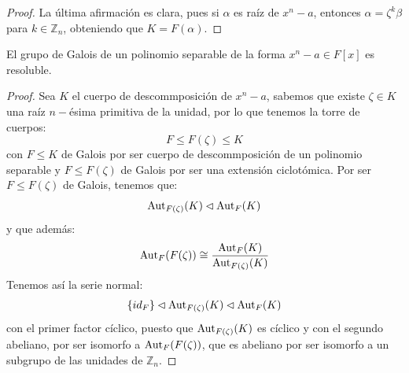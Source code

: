 \begin{teo}
\begin{proof}
        \noindent
        La última afirmación es clara, pues si $\alpha$ es raíz de $x^n-a$, entonces $\alpha = \zeta^k\beta$ para $k \in \mathbb{Z}_n$, obteniendo que $K = F(\alpha)$.
    \end{proof}
\end{teo}

\begin{prop}
    El grupo de Galois de un polinomio separable de la forma $x^n-a\in F[x]$ es resoluble.
    \begin{proof}
        Sea $K$ el cuerpo de descommposición de $x^n-a$, sabemos que existe $\zeta\in K$ una raíz $n-$ésima primitiva de la unidad, por lo que tenemos la torre de cuerpos:
        \begin{equation*}
            F\leq F(\zeta)\leq K
        \end{equation*}
        con $F\leq K$ de Galois por ser cuerpo de descommposición de un polinomio separable y $F\leq F(\zeta)$ de Galois por ser una extensión ciclotómica. Por ser $F\leq F(\zeta)$ de Galois, tenemos que:
        \begin{equation*}
            \operatorname{Aut}_{F(\zeta)}(K) \lhd \operatorname{Aut}_F(K)
        \end{equation*}
        y que además:
        \begin{equation*}
            \operatorname{Aut}_F(F(\zeta)) \cong \frac{\operatorname{Aut}_F(K)}{\operatorname{Aut}_{F(\zeta)}(K)}
        \end{equation*}
        Tenemos así la serie normal:
        \begin{equation*}
            \{id_F\} \lhd \operatorname{Aut}_{F(\zeta)}(K) \lhd \operatorname{Aut}_F(K)
        \end{equation*}
        con el primer factor cíclico, puesto que $\operatorname{Aut}_{F(\zeta)}(K)$ es cíclico y con el segundo abeliano, por ser isomorfo a $\operatorname{Aut}_F(F(\zeta))$, que es abeliano por ser isomorfo a un subgrupo de las unidades de $\mathbb{Z}_n$.
    \end{proof}
\end{prop}

